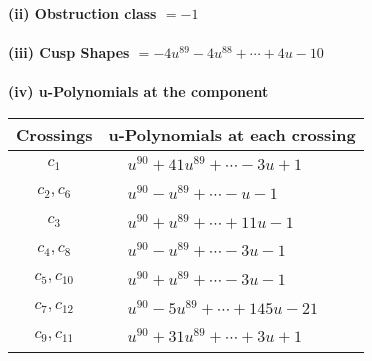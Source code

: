 \documentclass[1p]{elsarticle_modified}
\theoremstyle{definition}
\begin{document}
\flushleft \textbf{(ii) Obstruction class $= -1$}\\~\\
\flushleft \textbf{(iii) Cusp Shapes $= -4 u^{89}-4 u^{88}+\cdots+4 u-10$}\\~\\
\newpage\renewcommand{\arraystretch}{1}
\flushleft \textbf{(iv) u-Polynomials at the component}\newline \\
\begin{tabular}{m{50pt}|m{274pt}}
Crossings & \hspace{64pt}u-Polynomials at each crossing \\
\hline $$\begin{aligned}c_{1}\end{aligned}$$&$\begin{aligned}
&u^{90}+41 u^{89}+\cdots-3 u+1
\end{aligned}$\\
\hline $$\begin{aligned}c_{2},c_{6}\end{aligned}$$&$\begin{aligned}
&u^{90}- u^{89}+\cdots- u-1
\end{aligned}$\\
\hline $$\begin{aligned}c_{3}\end{aligned}$$&$\begin{aligned}
&u^{90}+u^{89}+\cdots+11 u-1
\end{aligned}$\\
\hline $$\begin{aligned}c_{4},c_{8}\end{aligned}$$&$\begin{aligned}
&u^{90}- u^{89}+\cdots-3 u-1
\end{aligned}$\\
\hline $$\begin{aligned}c_{5},c_{10}\end{aligned}$$&$\begin{aligned}
&u^{90}+u^{89}+\cdots-3 u-1
\end{aligned}$\\
\hline $$\begin{aligned}c_{7},c_{12}\end{aligned}$$&$\begin{aligned}
&u^{90}-5 u^{89}+\cdots+145 u-21
\end{aligned}$\\
\hline $$\begin{aligned}c_{9},c_{11}\end{aligned}$$&$\begin{aligned}
&u^{90}+31 u^{89}+\cdots+3 u+1
\end{aligned}$\\
\hline
\end{tabular}\\~\\
\end{document}
